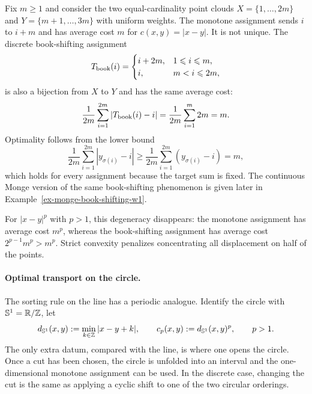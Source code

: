 \begin{example}\label{ex-book-shifting-w1}
		Fix $m\geq1$ and consider the two equal-cardinality point clouds
		$X=\{1,\ldots,2m\}$ and $Y=\{m+1,\ldots,3m\}$ with uniform weights.
		The monotone assignment sends $i$ to $i+m$ and has average cost $m$ for $c(x,y)=|x-y|$. It is not unique. The discrete book-shifting assignment
	\[
		T_{\rm book}(i)=
		\begin{cases}
			i+2m, & 1\leq i\leq m,\\
			i, & m<i\leq 2m,
		\end{cases}
	\]
	is also a bijection from $X$ to $Y$ and has the same average cost:
	\[
		\frac1{2m}\sum_{i=1}^{2m}|T_{\rm book}(i)-i|
		=
		\frac1{2m}\sum_{i=1}^{m}2m
		=m.
	\]
	Optimality follows from the lower bound
	\[
		\frac1{2m}\sum_{i=1}^{2m}|y_{\sigma(i)}-i|
		\geq
		\frac1{2m}\sum_{i=1}^{2m}(y_{\sigma(i)}-i)
		=m,
	\]
	which holds for every assignment because the target sum is fixed. The continuous Monge version of the same book-shifting phenomenon is given later in Example~\ref{ex-monge-book-shifting-w1}.

	For $|x-y|^p$ with $p>1$, this degeneracy disappears: the monotone assignment has average cost $m^p$, whereas the book-shifting assignment has average cost $2^{p-1}m^p>m^p$. Strict convexity penalizes concentrating all displacement on half of the points.
\end{example}

\paragraph{Optimal transport on the circle.}\label{rem-circle-ot-cut}

The sorting rule on the line has a periodic analogue. Identify the circle with $\mathbb S^1=\RR/\ZZ$, let
\[
	d_{\mathbb S^1}(x,y):=\min_{k\in\ZZ}|x-y+k|,
	\qquad
	c_p(x,y):=d_{\mathbb S^1}(x,y)^p,\qquad p>1.
\]
The only extra datum, compared with the line, is where one opens the circle. Once a cut has been chosen, the circle is unfolded into an interval and the one-dimensional monotone assignment can be used. In the discrete case, changing the cut is the same as applying a cyclic shift to one of the two circular orderings.

